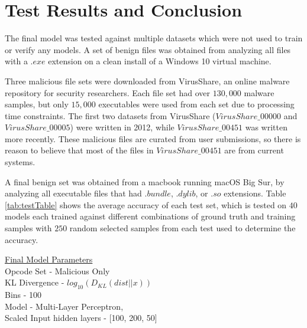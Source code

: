 
\section{Test Results and Conclusion}

The final model was tested against multiple datasets which were not used to train or verify any models.
A set of benign files was obtained from analyzing all files with a $.exe$ extension on a clean install of a Windows 10
virtual machine.

Three malicious file sets were downloaded from VirusShare\cite{virusShare1,virusShare5,virusShare451}, an online malware repository for security researchers.
Each file set had over $130,000$  malware samples, but only $15,000$ executables were used from each set due to
processing time constraints.
The first two datasets from VirusShare ($VirusShare\_00000$ and $VirusShare\_00005$) were written in 2012,
while $VirusShare\_00451$ was written more recently.
These malicious files are curated from user submissions, so there is reason to believe that most of the files in
$VirusShare\_00451$ are from current systems.

A final benign set was obtained from a macbook running macOS Big Sur, by analyzing all executable files
that had $.bundle$, $.dylib$, or $.so$ extensions.
Table \ref{tab:testTable} shows the average accuracy of each test set, which is tested on $40$ models each trained
against different combinations of ground truth and training samples with $250$ random selected samples from each test
used to determine the accuracy.



\begin{center}
    \underline{Final Model Parameters}\\
    Opcode Set - Malicious Only\\
    KL Divergence - $log_{10}(D_{KL}(dist||x))$\\
    Bins - 100\\
    Model - Multi-Layer Perceptron, \\
    \footnotesize{Scaled Input}
    \footnotesize{hidden layers - [100, 200, 50]}
\end{center}


